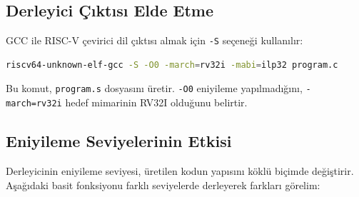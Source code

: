 \subsection{Derleyici Çıktısı Elde Etme}
\label{subsec:derleyici-ciktisi}

GCC ile RISC-V çevirici dil çıktısı almak için \texttt{-S} seçeneği kullanılır:

\begin{lstlisting}[language=bash]
riscv64-unknown-elf-gcc -S -O0 -march=rv32i -mabi=ilp32 program.c
\end{lstlisting}

Bu komut, \texttt{program.s} dosyasını üretir. \texttt{-O0} eniyileme yapılmadığını, \texttt{-march=rv32i} hedef mimarinin RV32I olduğunu belirtir.

\subsection{Eniyileme Seviyelerinin Etkisi}
\label{subsec:eniyileme}

Derleyicinin eniyileme seviyesi, üretilen kodun yapısını köklü biçimde değiştirir. Aşağıdaki basit fonksiyonu farklı seviyelerde derleyerek farkları görelim:

